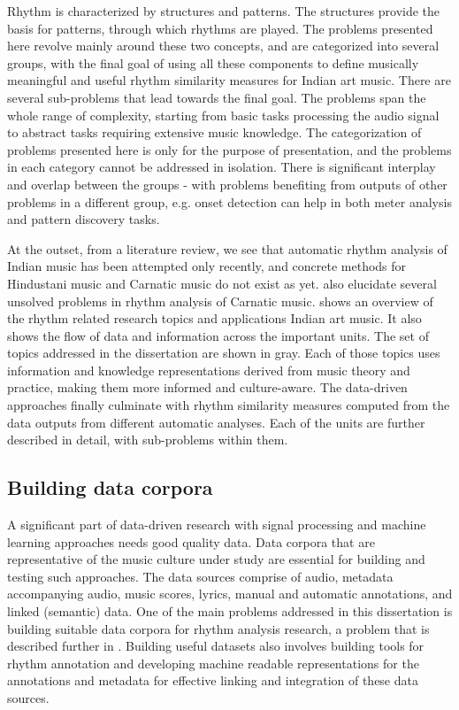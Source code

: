 Rhythm is characterized by structures and patterns. The structures provide the basis for patterns, through which rhythms are played. The problems presented here revolve mainly around these two concepts, and are categorized into several groups, with the final goal of using all these components to define musically meaningful and useful rhythm similarity measures for Indian art music. There are several sub-problems that lead towards the final goal. The problems span the whole range of complexity, starting from basic tasks processing the audio signal to abstract tasks requiring extensive music knowledge. The categorization of problems presented here is only for the purpose of presentation, and the problems in each category cannot be addressed in isolation. There is significant interplay and overlap between the groups - with problems benefiting from outputs of other problems in a different group, e.g. onset detection can help in both meter analysis and pattern discovery tasks. 

At the outset, from a literature review, we see that automatic rhythm analysis of Indian music has been attempted only recently, and concrete methods for Hindustani music and Carnatic music do not exist as yet.  also elucidate several unsolved problems in rhythm analysis of Carnatic music.  shows an overview of the rhythm related research topics and applications Indian art music. It also shows the flow of data and information across the important units. The set of topics addressed in the dissertation are shown in gray. Each of those topics uses information and knowledge representations derived from music theory and practice, making them more informed and culture-aware. The data-driven approaches finally culminate with rhythm similarity measures computed from the data outputs from different automatic analyses. Each of the units are further described in detail, with sub-problems within them. 
%
\subsection{Building data corpora}
A significant part of data-driven research with signal processing and machine learning approaches needs good quality data. Data corpora that are representative of the music culture under study are essential for building and testing such approaches. The data sources comprise of audio, metadata accompanying audio, music scores, lyrics, manual and automatic annotations, and linked (semantic) data. One of the main problems addressed in this dissertation is building suitable data corpora for rhythm analysis research, a problem that is described further in . Building useful datasets also involves building tools for rhythm annotation and developing machine readable representations for the annotations and metadata for effective linking and integration of these data sources. 
%
